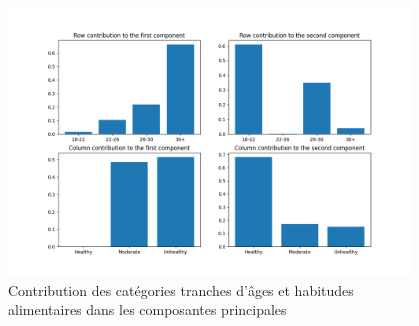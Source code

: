 \begin{figure}[!h]
  \begin{center}
    \includegraphics[width=0.95\textwidth]{Images/Age_Dietary_all/RowColumnsContributions.png}
  \end{center}
  \caption{Contribution des catégories tranches d'âges et habitudes alimentaires dans les composantes principales}
  \label{fig:contribAgeDietary}
\end{figure}

